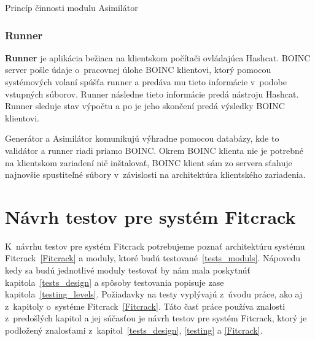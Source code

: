 \begin{algorithm}[h]
	\label{asimilator_alg}
	\caption{Princíp činnosti modulu Asimilátor}
	\DontPrintSemicolon
\end{algorithm}

\subsection{Runner}
\label{runner}
\textbf{Runner} je aplikácia bežiaca na klientskom počítači ovládajúca Hashcat.
BOINC server pošle údaje o~pracovnej úlohe BOINC klientovi, ktorý pomocou systémových volaní spúšťa runner a predáva mu tieto informácie v~podobe vstupných súborov.
Runner následne tieto informácie predá nástroju Hashcat.
Runner sleduje stav výpočtu a po je jeho skončení predá výsledky BOINC klientovi.


Generátor a Asimilátor komunikujú výhradne pomocou databázy, kde to validátor a runner riadi priamo BOINC.
Okrem BOINC klienta nie je potrebné na klientskom zariadení nič inštalovať, BOINC klient sám zo servera sťahuje najnovšie spustiteľné súbory v~závislosti na architektúra klientského zariadenia.

\chapter{Návrh testov pre systém Fitcrack}
K~návrhu testov pre systém Fitcrack potrebujeme poznať architektúru systému Fitcrack~\ref{Fitcrack} a moduly, ktoré budú testované~\ref{tests_moduls}.
Nápovedu kedy sa budú jednotlivé moduly testovať by nám mala poskytnúť kapitola~\ref{tests_design} a spôsoby testovania popisuje zase kapitola~\ref{testing_levels}. 
 Požiadavky na testy vyplývajú z~úvodu práce, ako aj z~kapitoly o~systéme Fitcrack~\ref{Fitcrack}.
 Táto časť práce používa znalosti z~predošlých kapitol a jej súčasťou je návrh testov pre systém Fitcrack, ktorý je podložený znalosťami z~kapitol~\ref{tests_design}, \ref{testing} a \ref{Fitcrack}.

